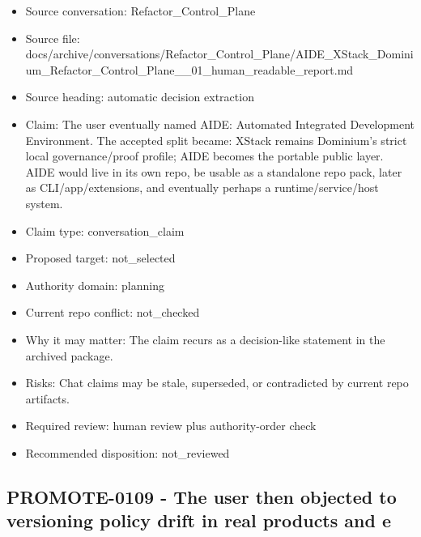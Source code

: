 \documentclass[11pt,a4paper]{report}
\begin{document}
\begin{itemize}
\item Source conversation: Refactor\_Control\_Plane
\item Source file: docs/archive/conversations/Refactor\_Control\_Plane/AIDE\_XStack\_Dominium\_Refactor\_Control\_Plane\_\_01\_human\_readable\_report.md
\item Source heading: automatic decision extraction
\item Claim: The user eventually named AIDE: Automated Integrated Development Environment. The accepted split became: XStack remains Dominium's strict local governance/proof profile; AIDE becomes the portable public layer. AIDE would live in its own repo, be usable as a standalone repo pack, later as CLI/app/extensions, and eventually perhaps a runtime/service/host system.
\item Claim type: conversation\_claim
\item Proposed target: not\_selected
\item Authority domain: planning
\item Current repo conflict: not\_checked
\item Why it may matter: The claim recurs as a decision-like statement in the archived package.
\item Risks: Chat claims may be stale, superseded, or contradicted by current repo artifacts.
\item Required review: human review plus authority-order check
\item Recommended disposition: not\_reviewed
\end{itemize}

\subsection{PROMOTE-0109 - The user then objected to versioning policy drift in real products and e}
\end{document}
